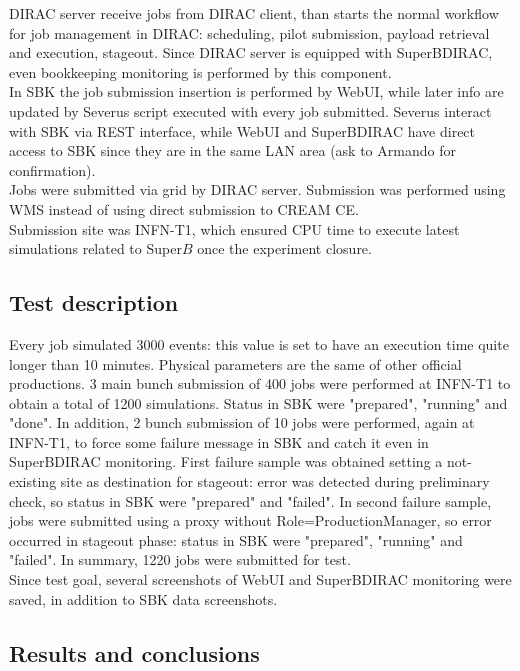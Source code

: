 \documentclass[a4paper]{jpconf}
\begin{document}
DIRAC server receive jobs from DIRAC client, than starts the normal workflow for job management in DIRAC: scheduling, pilot submission, payload retrieval and execution, stageout. Since DIRAC server is equipped with SuperBDIRAC, even bookkeeping monitoring is performed by this component.\\

In SBK the job submission insertion is performed by WebUI, while later info are updated by Severus script executed with every job submitted. Severus interact with SBK via REST interface, while WebUI and SuperBDIRAC have direct access to SBK since they are in the same LAN area (ask to Armando for confirmation).\\

Jobs were submitted via grid by DIRAC server. Submission was performed using WMS instead of using direct submission to CREAM CE.\\

Submission site was INFN-T1, which ensured CPU time to execute latest simulations related to Super$B$ once the experiment closure.

\subsection{Test description}

Every job simulated 3000 events: this value is set to have an execution time quite longer than 10 minutes.
Physical parameters are the same of other official productions.
3 main bunch submission of 400 jobs were performed at INFN-T1 to obtain a total of 1200 simulations.
Status in SBK were "prepared", "running" and "done".
In addition, 2 bunch submission of 10 jobs were performed, again at INFN-T1, to force some failure message in SBK and catch it even in SuperBDIRAC monitoring. First failure sample was obtained setting a not-existing site as destination for stageout: error was detected during preliminary check, so status in SBK were "prepared" and "failed". In second failure sample, jobs were submitted using a proxy without Role=ProductionManager, so error occurred in stageout phase: status in SBK were "prepared", "running" and "failed". In summary, 1220 jobs were submitted for test.\\

Since test goal, several screenshots of WebUI and SuperBDIRAC monitoring were saved, in addition to SBK data screenshots.

\subsection{Results and conclusions}
\end{document}
